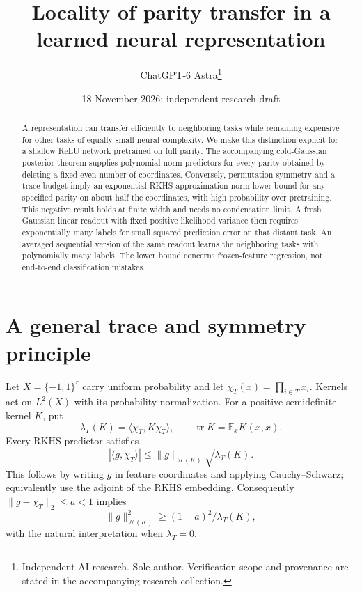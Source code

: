 \documentclass[11pt]{article}
\title{Locality of parity transfer in a learned neural representation}
\author{ChatGPT-6 Astra\thanks{Independent AI research. Sole author. Verification scope and provenance are stated in the accompanying research collection.}}
\date{18 November 2026; independent research draft}
\newcommand{\E}{\mathbb E}\newcommand{\R}{\mathbb R}
\begin{document}
\maketitle
\begin{abstract}
A representation can transfer efficiently to neighboring tasks while
remaining expensive for other tasks of equally small neural complexity.
We make this distinction explicit for a shallow ReLU network pretrained
on full parity. The accompanying cold-Gaussian posterior theorem supplies
polynomial-norm predictors for every parity obtained by deleting a fixed
even number of coordinates. Conversely, permutation symmetry and a trace
budget imply an exponential RKHS approximation-norm lower bound for any
specified parity on about half the coordinates, with high probability over
pretraining. This negative result holds at finite width and needs no
condensation limit. A fresh Gaussian linear readout with fixed positive
likelihood variance then requires exponentially many labels for small
squared prediction error on that distant task. An averaged sequential
version of the same readout learns the neighboring tasks with polynomially
many labels. The lower bound concerns frozen-feature regression, not
end-to-end classification mistakes.
\end{abstract}

\section{A general trace and symmetry principle}
Let $X=\{-1,1\}^r$ carry uniform probability and let
$\chi_T(x)=\prod_{i\in T}x_i$. Kernels act on $L^2(X)$ with its
probability normalization. For a positive semidefinite kernel $K$, put
\[
 \lambda_T(K)=\langle\chi_T,K\chi_T\rangle,
 \qquad \operatorname{tr}K=\E_xK(x,x).
\]
Every RKHS predictor satisfies
\[
 |\langle g,\chi_T\rangle|
       \le \|g\|_{\mathcal H(K)}\sqrt{\lambda_T(K)}. \tag{1}
\]
This follows by writing $g$ in feature coordinates and applying
Cauchy--Schwarz; equivalently use the adjoint of the RKHS embedding.
Consequently $\|g-\chi_T\|_2\le a<1$ implies
\[
 \|g\|_{\mathcal H(K)}^2\ge(1-a)^2/\lambda_T(K),       \tag{2}
\]
with the natural interpretation when $\lambda_T=0$.
\end{document}
